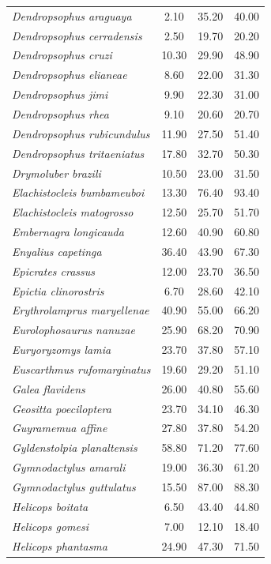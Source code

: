 \documentclass[12pt,openright,oneside,a4paper,english]{abntex2}
\begin{document}
\begin{longtable}{lccc}
	\textit{Dendropsophus araguaya}&2.10 &35.20 &40.00 \\
	\textit{Dendropsophus cerradensis}&2.50 &19.70 &20.20 \\
	\textit{Dendropsophus cruzi}&10.30 &29.90 &48.90 \\
	\textit{Dendropsophus elianeae}&8.60 &22.00 &31.30 \\
	\textit{Dendropsophus jimi}&9.90 &22.30 &31.00 \\
	\textit{Dendropsophus rhea}&9.10 &20.60 &20.70 \\
	\textit{Dendropsophus rubicundulus}&11.90 &27.50 &51.40 \\
	\textit{Dendropsophus tritaeniatus}&17.80 &32.70 &50.30 \\
	\textit{Drymoluber brazili}&10.50 &23.00 &31.50 \\
	\textit{Elachistocleis bumbameuboi}&13.30 &76.40 &93.40 \\
	\textit{Elachistocleis matogrosso}&12.50 &25.70 &51.70 \\
	\textit{Embernagra longicauda}&12.60 &40.90 &60.80 \\
	\textit{Enyalius capetinga}&36.40 &43.90 &67.30 \\
	\textit{Epicrates crassus}&12.00 &23.70 &36.50 \\
	\textit{Epictia clinorostris}&6.70 &28.60 &42.10 \\
	\textit{Erythrolamprus maryellenae}&40.90 &55.00 &66.20 \\
	\textit{Eurolophosaurus nanuzae}&25.90 &68.20 &70.90 \\
	\textit{Euryoryzomys lamia}&23.70 &37.80 &57.10 \\
	\textit{Euscarthmus rufomarginatus}&19.60 &29.20 &51.10 \\
	\textit{Galea flavidens}&26.00 &40.80 &55.60 \\
	\textit{Geositta poeciloptera}&23.70 &34.10 &46.30 \\
	\textit{Guyramemua affine}&27.80 &37.80 &54.20 \\
	\textit{Gyldenstolpia planaltensis}&58.80 &71.20 &77.60 \\
	\textit{Gymnodactylus amarali}&19.00 &36.30 &61.20 \\
	\textit{Gymnodactylus guttulatus}&15.50 &87.00 &88.30 \\
	\textit{Helicops boitata}&6.50 &43.40 &44.80 \\
	\textit{Helicops gomesi}&7.00 &12.10 &18.40 \\
	\textit{Helicops phantasma}&24.90 &47.30 &71.50 \\

\end{longtable}
\end{document}
